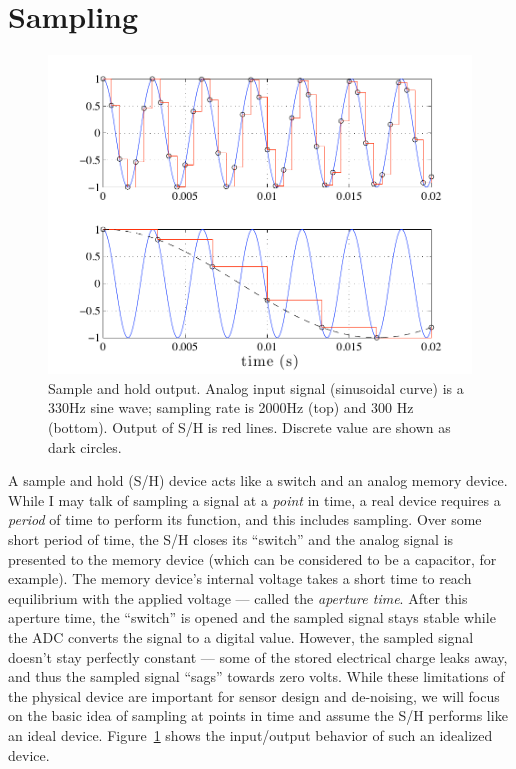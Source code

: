 \section{Sampling}

\begin{figure}
\centerline{\includegraphics[width=\textwidth]{ch-computer/sampled}}
\caption[Sample and hold output]{Sample and hold
output. Analog input signal (sinusoidal curve) is a 330Hz sine wave; sampling
rate is 2000Hz (top) and 300 Hz (bottom). Output of S/H is red lines. Discrete value are shown as dark circles.\label{fg:sampled}}
\end{figure}

A sample and hold (S/H) device acts like a switch and an analog memory device. While I may
talk of sampling a signal at a \emph{point} in time, a real device
requires a \emph{period} of time to perform its function, and this
includes sampling.  Over some short period of time, the S/H closes its
``switch'' and the analog signal is presented to the memory
device (which can be considered to be a capacitor, for example). The
memory device's internal voltage takes a short time to reach
equilibrium with the applied voltage --- called the \emph{aperture time}. After this aperture time,
the ``switch'' is opened and the sampled signal stays
stable while the ADC converts the signal to a digital value. However, the sampled signal 
doesn't stay perfectly constant --- some of the stored electrical
charge leaks away, and thus the sampled signal ``sags'' towards zero
volts.  While these limitations of the physical device are
important for sensor design and de-noising, we will focus on the basic idea of sampling at points in
time and assume the S/H performs like an ideal
device. Figure~\ref{fg:sampled} shows the input/output behavior of
such an idealized device.

